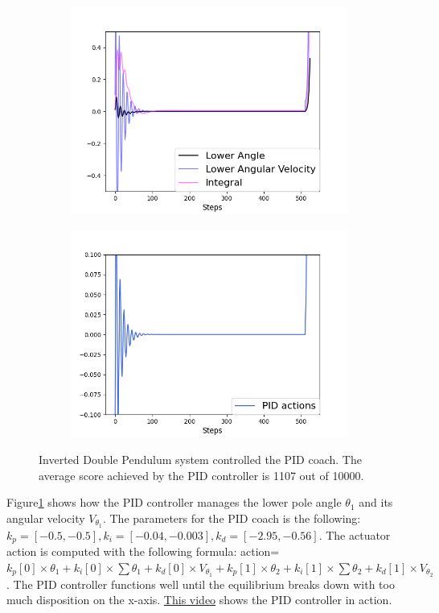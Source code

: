 \begin{figure}[H]
\centering
\begin{subfigure}{0.4\textwidth}
  \centering
  \includegraphics[width=\linewidth]{double_PID.png}
\end{subfigure}%
\begin{subfigure}{.4\textwidth}
  \centering
  \includegraphics[width=\linewidth]{double_PID_actions.png}
\end{subfigure}
\caption{Inverted Double Pendulum system controlled the PID coach. The average score achieved by the PID controller is 1107 out of 10000. }
\label{fig:double}
\end{figure}

Figure\ref{fig:double} shows how the PID controller manages the lower pole angle $\theta_1$ and its angular velocity $V_{\theta_1}$. The parameters for the PID coach is the following: $k_p=[-0.5,-0.5], k_i=[-0.04,-0.003], k_d=[-2.95,-0.56]$. The actuator action is computed with the following formula: action=$k_p[0]\times \theta_1+k_i[0]\times \sum{\theta_1}+k_d[0]\times V_{\theta_1}+k_p[1]\times \theta_2+k_i[1]\times \sum{\theta_2}+k_d[1]\times V_{\theta_2}$. The PID controller functions well until the equilibrium breaks down with too much disposition on the x-axis. \href{https://www.youtube.com/watch?v=9H0PmibeFqY}{This video} shows the PID controller in action.

